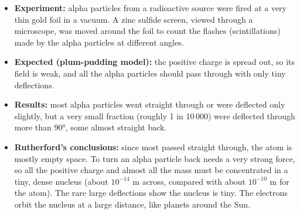 \documentclass[12pt]{article}
\begin{document}
\ansq
\begin{crit}
\end{crit}
\sample
\begin{itemize}
  \item \textbf{Experiment:} alpha particles from a radioactive source were fired at a very thin gold foil
        in a vacuum. A zinc sulfide screen, viewed through a microscope, was moved around the foil to count
        the flashes (scintillations) made by the alpha particles at different angles.
  \item \textbf{Expected (plum-pudding model):} the positive charge is spread out, so its field is weak,
        and all the alpha particles should pass through with only tiny deflections.
  \item \textbf{Results:} most alpha particles went straight through or were deflected only slightly, but
        a very small fraction (roughly 1 in 10\,000) were deflected through more than \ang{90}, some almost
        straight back.
  \item \textbf{Rutherford's conclusions:} since most passed straight through, the atom is mostly empty
        space. To turn an alpha particle back needs a very strong force, so all the positive charge and
        almost all the mass must be concentrated in a tiny, dense nucleus (about $10^{-14}$ m across,
        compared with about $10^{-10}$ m for the atom). The rare large deflections show the nucleus is
        tiny. The electrons orbit the nucleus at a large distance, like planets around the Sun.
\end{itemize}
\end{document}
